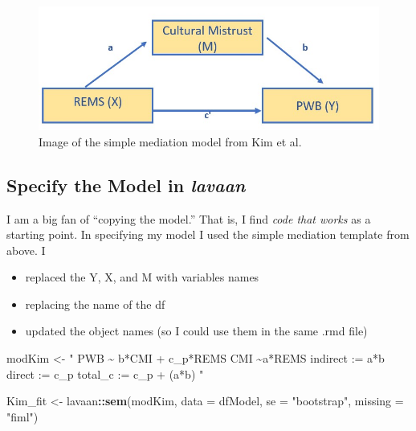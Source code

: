 \documentclass[
  11pt,
]{book}
\newenvironment{Shaded}{\begin{snugshade}}{\end{snugshade}}
\newcommand{\AttributeTok}[1]{\textcolor[rgb]{0.27,0.27,0.27}{#1}}
\newcommand{\FunctionTok}[1]{\textcolor[rgb]{0.27,0.27,0.27}{\textbf{#1}}}
\newcommand{\NormalTok}[1]{#1}
\newcommand{\OtherTok}[1]{\textcolor[rgb]{0.37,0.37,0.37}{#1}}
\newcommand{\SpecialCharTok}[1]{\textcolor[rgb]{0.43,0.43,0.43}{\textbf{#1}}}
\newcommand{\StringTok}[1]{\textcolor[rgb]{0.5,0.5,0.5}{#1}}
\providecommand{\tightlist}{%
  \setlength{\itemsep}{0pt}\setlength{\parskip}{0pt}}
\begin{document}
\begin{figure}
\centering
\includegraphics{images/SimpleMed/Kim_SimpMed.jpg}
\caption{Image of the simple mediation model from Kim et al.}
\end{figure}

\hypertarget{specify-the-model-in-lavaan}{%
\subsection{\texorpdfstring{Specify the Model in \emph{lavaan}}{Specify the Model in lavaan}}\label{specify-the-model-in-lavaan}}

I am a big fan of ``copying the model.'' That is, I find \emph{code that works} as a starting point. In specifying my model I used the simple mediation template from above. I

\begin{itemize}
\tightlist
\item
  replaced the Y, X, and M with variables names
\item
  replacing the name of the df
\item
  updated the object names (so I could use them in the same .rmd file)
\end{itemize}

\begin{Shaded}
\begin{Highlighting}[]
\NormalTok{modKim }\OtherTok{\textless{}{-}} \StringTok{"}
\StringTok{          PWB \textasciitilde{} b*CMI + c\_p*REMS }
\StringTok{          CMI \textasciitilde{}a*REMS}
\StringTok{          }
\StringTok{          indirect :=  a*b}
\StringTok{          direct  := c\_p}
\StringTok{          total\_c  := c\_p + (a*b)}
\StringTok{          "}
\end{Highlighting}
\end{Shaded}

\begin{Shaded}
\begin{Highlighting}[]
\NormalTok{Kim\_fit }\OtherTok{\textless{}{-}}\NormalTok{ lavaan}\SpecialCharTok{::}\FunctionTok{sem}\NormalTok{(modKim, }\AttributeTok{data =}\NormalTok{ dfModel, }\AttributeTok{se =} \StringTok{"bootstrap"}\NormalTok{, }\AttributeTok{missing =} \StringTok{"fiml"}\NormalTok{)}
\end{Highlighting}
\end{Shaded}
\end{document}

